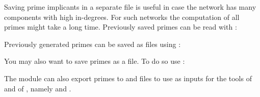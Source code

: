 \documentclass[letterpaper,10pt,english]{sphinxmanual}
\begin{document}
Saving prime implicants in a separate file is useful in case the network has many components with high in-degrees.
For such networks the computation of all primes might take a long time.
Previously saved primes can be read with {\hyperref[\detokenize{FileExchange:read-primes}]{}}:

\begin{sphinxVerbatim}[commandchars=\\\{\}]
  
\end{sphinxVerbatim}

Previously generated primes can be saved as  files using {\hyperref[\detokenize{FileExchange:write-primes}]{}}:

\begin{sphinxVerbatim}[commandchars=\\\{\}]
 
\end{sphinxVerbatim}

You may also want to save primes as a  file.
To do so use {\hyperref[\detokenize{FileExchange:primes2bnet}]{}}:

\begin{sphinxVerbatim}[commandchars=\\\{\}]
 
\end{sphinxVerbatim}

The module {\hyperref[\detokenize{FileExchange:fileexchange}]{}} can also export primes to  and  files to use as inputs for the tools  of {\hyperref[\detokenize{Bibliography:dubrova2011}]{}} and  of {\hyperref[\detokenize{Bibliography:garg2008}]{}}, namely {\hyperref[\detokenize{FileExchange:primes2bns}]{}} and {\hyperref[\detokenize{FileExchange:primes2genysis}]{}}.
\end{document}
